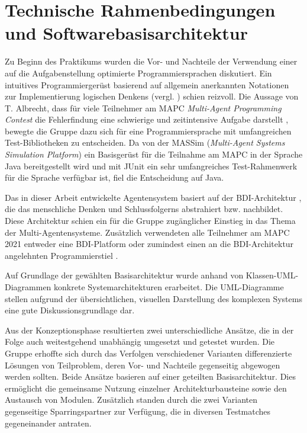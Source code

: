\documentclass[runningheads]{llncs}
\begin{document}
\section{Technische Rahmenbedingungen und Softwarebasisarchitektur}
Zu Beginn des Praktikums wurden die Vor- und Nachteile der Verwendung einer auf die Aufgabenstellung optimierte Programmiersprachen diskutiert. Ein intuitives Programmiergerüst basierend auf allgemein anerkannten Notationen zur Implementierung logischen Denkens (vergl. \cite{Goal}) schien reizvoll. Die Aussage von T. Albrecht, dass für viele Teilnehmer am MAPC \textit{Multi-Agent Programming Contest} die Fehlerfindung eine schwierige und zeitintensive Aufgabe darstellt \cite[S. 17]{Ahlbrecht2021}, bewegte die Gruppe dazu sich für eine Programmiersprache mit umfangreichen Test-Bibliotheken zu entscheiden. Da von der MASSim (\textit{Multi-Agent Systems Simulation Platform}) ein Basisgerüst für die Teilnahme am MAPC in der Sprache Java bereitgestellt wird und mit JUnit \cite{JUnit} ein sehr umfangreiches Test-Rahmenwerk für die Sprache verfügbar ist, fiel die Entscheidung auf Java. 


Das in dieser Arbeit entwickelte Agentensystem basiert auf der BDI-Architektur \cite{Bratman1987}, die das menschliche Denken und Schlussfolgerns abstrahiert bzw. nachbildet. Diese Architektur schien ein für die Gruppe zugänglicher Einstieg in das Thema der Multi-Agentensysteme. Zusätzlich verwendeten alle Teilnehmer am MAPC 2021 entweder eine BDI-Platform oder zumindest einen an die BDI-Architektur angelehnten Programmierstiel \cite[S. 10]{Ahlbrecht2021}.

Auf Grundlage der gewählten Basisarchitektur wurde anhand von Klassen-UML-Diagrammen konkrete Systemarchitekturen erarbeitet. Die UML-Diagramme stellen aufgrund der übersichtlichen, visuellen Darstellung des komplexen Systems eine gute Diskussionsgrundlage dar.

Aus der Konzeptionsphase resultierten zwei unterschiedliche Ansätze, die in der Folge auch weitestgehend unabhängig umgesetzt und getestet wurden. Die Gruppe erhoffte sich durch das Verfolgen verschiedener Varianten differenzierte Lösungen von Teilproblem, deren Vor- und Nachteile gegenseitig abgewogen werden sollten. Beide Ansätze basieren auf einer geteilten Basisarchitektur. Dies ermöglicht die gemeinsame Nutzung einzelner Architekturbausteine sowie den Austausch von Modulen. Zusätzlich standen durch die zwei Varianten gegenseitige Sparringspartner zur Verfügung, die in diversen Testmatches gegeneinander antraten.
\end{document}
